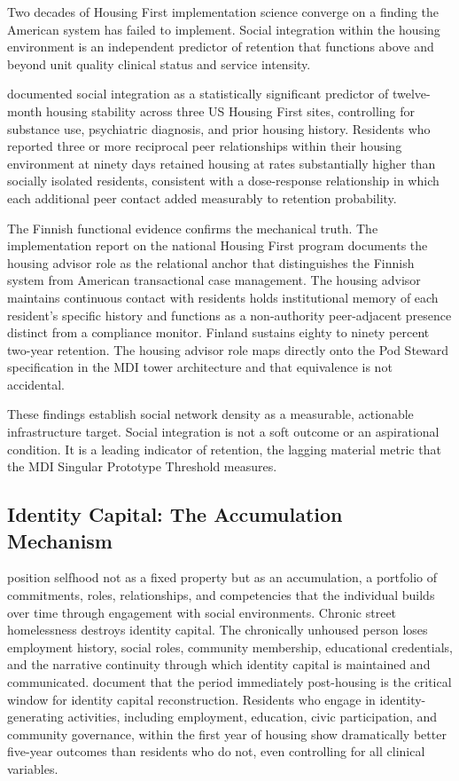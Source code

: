\documentclass[12pt, letterpaper]{article}
\begin{document}
Two decades of Housing First implementation science converge on a finding the American system has failed to implement. Social integration within the housing environment is an independent predictor of retention that functions above and beyond unit quality clinical status and service intensity.

\citet{tsai_2012} documented social integration as a statistically significant predictor of twelve-month housing stability across three US Housing First sites, controlling for substance use, psychiatric diagnosis, and prior housing history. Residents who reported three or more reciprocal peer relationships within their housing environment at ninety days retained housing at rates substantially higher than socially isolated residents, consistent with a dose-response relationship in which each additional peer contact added measurably to retention probability.

The Finnish functional evidence confirms the mechanical truth. The \citet{yfoundation_2022} implementation report on the national Housing First program documents the housing advisor role as the relational anchor that distinguishes the Finnish system from American transactional case management. The housing advisor maintains continuous contact with residents holds institutional memory of each resident's specific history and functions as a non-authority peer-adjacent presence distinct from a compliance monitor. Finland sustains eighty to ninety percent two-year retention. The housing advisor role maps directly onto the Pod Steward specification in the MDI tower architecture and that equivalence is not accidental.

These findings establish social network density as a measurable, actionable infrastructure target. Social integration is not a soft outcome or an aspirational condition. It is a leading indicator of retention, the lagging material metric that the MDI Singular Prototype Threshold measures.

\subsection{Identity Capital: The Accumulation Mechanism}

\citet{cote_levine_2002} position selfhood not as a fixed property but as an accumulation, a portfolio of commitments, roles, relationships, and competencies that the individual builds over time through engagement with social environments. Chronic street homelessness destroys identity capital. The chronically unhoused person loses employment history, social roles, community membership, educational credentials, and the narrative continuity through which identity capital is maintained and communicated. \citet{klodnick_samuels_2020} document that the period immediately post-housing is the critical window for identity capital reconstruction. Residents who engage in identity-generating activities, including employment, education, civic participation, and community governance, within the first year of housing show dramatically better five-year outcomes than residents who do not, even controlling for all clinical variables.
\end{document}
